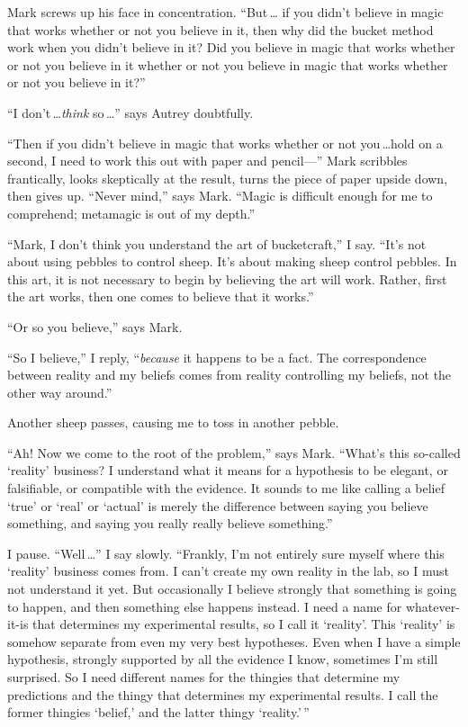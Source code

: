 {
  Mark screws up his face in concentration. ``But\,\ldots
  if you didn't believe in magic that works whether
or not you believe in it, then why did the bucket method work when you
didn't believe in it? Did you believe in magic that
works whether or not you believe in it whether or not you believe in
magic that works whether or not you believe in it?''}

{
  ``I don't\,\ldots \textit{think} so\,\ldots''
  says Autrey doubtfully.}

{
 ``Then if you didn't believe in
magic that works whether or not you\,\ldots hold on a second, I need to
work this out with paper and pencil---'' Mark
scribbles frantically, looks skeptically at the result, turns the piece
of paper upside down, then gives up. ``Never
mind,'' says Mark. ``Magic is
difficult enough for me to comprehend; metamagic is out of my
depth.''}

{
 ``Mark, I don't think you
understand the art of bucketcraft,'' I say.
``It's not about using pebbles to
control sheep. It's about making sheep control pebbles.
In this art, it is not necessary to begin by believing the art will
work. Rather, first the art works, then one comes to believe that it
works.''}

{
 ``Or so you believe,'' says
Mark.}

{
 ``So I believe,'' I reply,
``\textit{because} it happens to be a fact. The
correspondence between reality and my beliefs comes from reality
controlling my beliefs, not the other way around.''}

{
 Another sheep passes, causing me to toss in another pebble.}

{
 ``Ah! Now we come to the root of the
problem,'' says Mark.
``What's this so-called
`reality' business? I understand what it
means for a hypothesis to be elegant, or falsifiable, or compatible
with the evidence. It sounds to me like calling a belief
`true' or
`real' or
`actual' is merely the difference
between saying you believe something, and saying you really really
believe something.''}

\label{reality_defined}
{
 I pause. ``Well\,\ldots'' I say
slowly. ``Frankly, I'm not entirely
sure myself where this `reality'
business comes from. I can't create my own reality in
the lab, so I must not understand it yet. But occasionally I believe
strongly that something is going to happen, and then something else
happens instead. I need a name for whatever-it-is that determines my
experimental results, so I call it
`reality'. This
`reality' is somehow separate from even
my very best hypotheses. Even when I have a simple hypothesis, strongly
supported by all the evidence I know, sometimes I'm
still surprised. So I need different names for the thingies that
determine my predictions and the thingy that determines my experimental
results. I call the former thingies
`belief,' and the latter thingy
`reality.'\,''}


